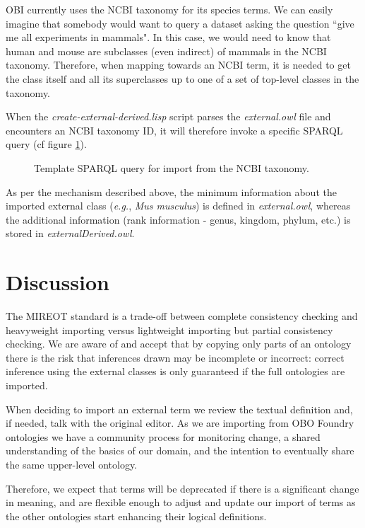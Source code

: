 \documentclass[a4paper,10pt,twocolumn]{article}
\begin{document}
OBI currently uses the NCBI taxonomy for its species terms.
We can easily imagine that somebody would want to query a dataset asking the question ``give me all experiments in mammals".
In this case, we would need to know that human and mouse are subclasses (even indirect) of mammals in the NCBI taxonomy.
Therefore, when mapping towards an NCBI term, it is needed to get the class itself and all its superclasses up to one of a set of top-level classes in the taxonomy.

When the \emph{create-external-derived.lisp} script parses the \emph{external.owl} file and encounters an NCBI taxonomy ID, it will therefore invoke a specific SPARQL query (cf figure \ref{fig:sparql2}). 
\begin{figure}[t]
\scriptsize
 
\caption{Template SPARQL query for import from the NCBI taxonomy.}
\label{fig:sparql2}
\end{figure}
As per the mechanism described above, the minimum information about the imported external class (\emph{e.g.}, \emph{Mus musculus}) is defined in \emph{external.owl}, whereas the additional information (rank information - genus, kingdom, phylum, etc.) is stored in \emph{ externalDerived.owl}. 

\section*{Discussion}


The MIREOT standard is a trade-off between complete consistency checking and heavyweight importing versus lightweight importing but partial consistency checking.
We are aware of and accept that by copying only parts of an ontology there is the risk that inferences drawn may be incomplete or incorrect: correct inference using the external classes is only guaranteed if the full ontologies are imported.

When deciding to import an external term we review the textual definition and, if needed, talk with the original editor.
As we are importing from OBO Foundry ontologies we have a community process for monitoring change, a shared understanding of the basics of our domain, and the intention to eventually share the same upper-level ontology. 

Therefore, we expect that terms will be deprecated if there is a significant change in meaning, and are flexible enough to adjust and update our import of terms as the other ontologies start enhancing their logical definitions.
\end{document}
